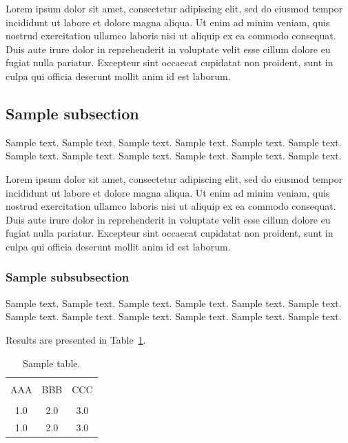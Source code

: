 \documentclass[jou,apacite]{apa6}
\begin{document}
Lorem ipsum dolor sit amet, consectetur adipiscing elit, sed do eiusmod tempor incididunt ut labore et dolore magna aliqua. Ut enim ad minim veniam, quis nostrud exercitation ullamco laboris nisi ut aliquip ex ea commodo consequat. Duis aute irure dolor in reprehenderit in voluptate velit esse cillum dolore eu fugiat nulla pariatur. Excepteur sint occaecat cupidatat non proident, sunt in culpa qui officia deserunt mollit anim id est laborum.

\subsection{Sample subsection}
Sample text. Sample text. Sample text. Sample text. Sample text. Sample text. 
Sample text. Sample text. Sample text. Sample text. Sample text. Sample text. 

Lorem ipsum dolor sit amet, consectetur adipiscing elit, sed do eiusmod tempor incididunt ut labore et dolore magna aliqua. Ut enim ad minim veniam, quis nostrud exercitation ullamco laboris nisi ut aliquip ex ea commodo consequat. Duis aute irure dolor in reprehenderit in voluptate velit esse cillum dolore eu fugiat nulla pariatur. Excepteur sint occaecat cupidatat non proident, sunt in culpa qui officia deserunt mollit anim id est laborum.

\subsubsection{Sample subsubsection}
Sample text. Sample text. Sample text. Sample text. Sample text. Sample text. 
Sample text. Sample text. Sample text. Sample text. Sample text. Sample text. 


Results are presented in Table~\ref{tab1}.
\begin{table}[!htb]
\caption{Sample table.}\label{tab1}
\begin{tabular}{ccc}
\hline\\[-1.5ex]
AAA & BBB & CCC \\[0.5ex]
\hline\\[-1.5ex]
1.0 & 2.0 & 3.0\\[0.5ex]
1.0 & 2.0 & 3.0\\[0.5ex]
\hline
\end{tabular}
\end{table}



\end{document}
